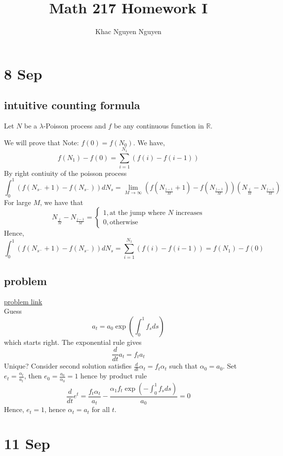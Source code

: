 \documentclass[11pt]{article}
\title{\textbf{Math 217 Homework I}}
\author{Khac Nguyen Nguyen}
\date{}
\begin{document}
\tableofcontents
\pagebreak
\section{8 Sep}
\subsection{intuitive counting formula}
Let $N$ be a $\lambda$-Poisson process and $f$ be any continuous function in $\mathbb{R}$. 

We will prove that 
Note: $f(0) = f(N_0)$.
We have, 
\[
    f(N_1) - f(0) = \sum_{i=1}^{N_1} \left(f(i)-f(i-1) \right)
\]
By right contiuity of the poisson process 
\[
    \int_0^1 \left(f(N_{s^-} + 1) - f(N_{s^-})\right) dN_s = \lim_{M \to \infty} \left(f\left(N_{\frac{j-1}{M}}+1\right) - f\left(N_{\frac{j-1}{M}}\right) \right) \left(N_{\frac{j}{M}} - N_{\frac{j-1}{M}}\right)
\]
For large $M$, we have that 
\[
    N_{\frac{j}{M}} - N_{\frac{j-1}{M}} = 
    \begin{cases}
        1, \text{at the jump where $N$ increases} \\
        0, \text{otherwise}
    \end{cases}  
\] 
Hence, 
\[
    \int_0^1 \left(f(N_{s^-} + 1) - f(N_{s^-})\right) dN_s = \sum_{i=1}^{N_1} \left(f(i)-f(i-1) \right) = f(N_1) - f(0)
\]
\newpage
\subsection{problem}
\href{https://sbsprobability.com/b/43432?context=%5B"25842"%2C"m8"%2C"m8_1"%2C"43241"%5D}{problem link} \\
Guess
\[
    a_t = a_0 \exp \left({\int_0^1 f_s ds}\right)
\]
which starts right. The exponential rule gives 
\[
    \frac{d}{dt} a_t = f_t a_t    
\]
Unique? Consider second solution satisfies $\frac{d}{dt} \alpha_t = f_t \alpha_t$ such that $\alpha_0 = a_0$. 
Set $e_t = \frac{\alpha_t}{a_t}$, then $e_0 = \frac{a_0}{\alpha_0} = 1$ hence by product rule
\[
    \frac{d}{dt} e^t = \frac{f_t \alpha_t}{a_t} - \frac{\alpha_1 f_t \exp \left({-\int_0^1 f_s ds}\right)}{a_0} = 0
\]
Hence, $e_t = 1$, hence $\alpha_t = a_t$ for all $t$.
\section{11 Sep}
\end{document}
